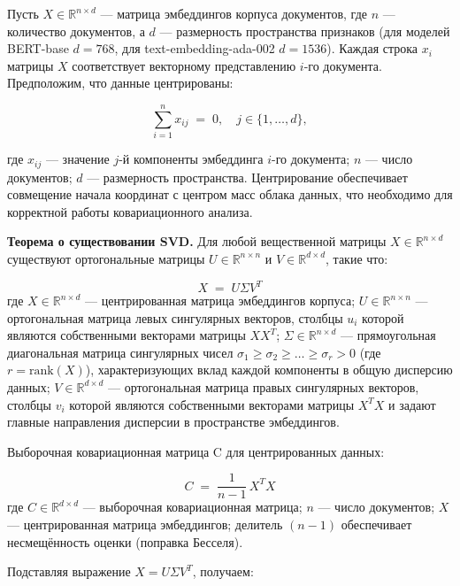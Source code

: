 \documentclass[a4paper, 12pt, oneside, openany]{article}
\begin{document}
Пусть $X \in \mathbb{R}^{n \times d}$ --- матрица эмбеддингов корпуса документов, где $n$ --- количество документов, а $d$ --- размерность пространства признаков (для моделей BERT-base $d = 768$, для text-embedding-ada-002 $d = 1536$). Каждая строка $x_{i}$ матрицы $X$ соответствует векторному представлению $i$-го документа. Предположим, что данные центрированы:

\[
\sum_{i = 1}^{n} x_{ij} \;=\; 0, \quad j \in \{1, \ldots, d\},
\]

где $x_{ij}$ --- значение $j$-й компоненты эмбеддинга $i$-го документа; $n$ --- число документов; $d$ --- размерность пространства. Центрирование обеспечивает совмещение начала координат с центром масс облака данных, что необходимо для корректной работы ковариационного анализа.

\textbf{Теорема о существовании SVD.} Для любой вещественной матрицы $X \in \mathbb{R}^{n \times d}$ существуют ортогональные матрицы $U \in \mathbb{R}^{n \times n}$ и $V \in \mathbb{R}^{d \times d}$, такие что:

\begin{equation}
	X \;=\; U \Sigma V^{T}
	\label{eq:2-1}
\end{equation}
где $X \in \mathbb{R}^{n \times d}$ --- центрированная матрица эмбеддингов корпуса; $U \in \mathbb{R}^{n \times n}$ --- ортогональная матрица левых сингулярных векторов, столбцы $u_{i}$ которой являются собственными векторами матрицы $X X^{T}$; $\Sigma \in \mathbb{R}^{n \times d}$ --- прямоугольная диагональная матрица сингулярных чисел $\sigma_{1} \geq \sigma_{2} \geq \ldots \geq \sigma_{r} > 0$ (где $r = \mathrm{rank}(X)$), характеризующих вклад каждой компоненты в общую дисперсию данных; $V \in \mathbb{R}^{d \times d}$ --- ортогональная матрица правых сингулярных векторов, столбцы $v_{i}$ которой являются собственными векторами матрицы $X^{T} X$ и задают главные направления дисперсии в пространстве эмбеддингов.

Выборочная ковариационная матрица C для центрированных данных:

\begin{equation}
	C \;=\; \frac{1}{n - 1}\, X^{T} X
	\label{eq:2-2}
\end{equation}
где $C \in \mathbb{R}^{d \times d}$ --- выборочная ковариационная матрица; $n$ --- число документов; $X$ --- центрированная матрица эмбеддингов; делитель $(n - 1)$ обеспечивает несмещённость оценки (поправка Бесселя).

Подставляя выражение $X = U \Sigma V^{T}$, получаем:
\end{document}
